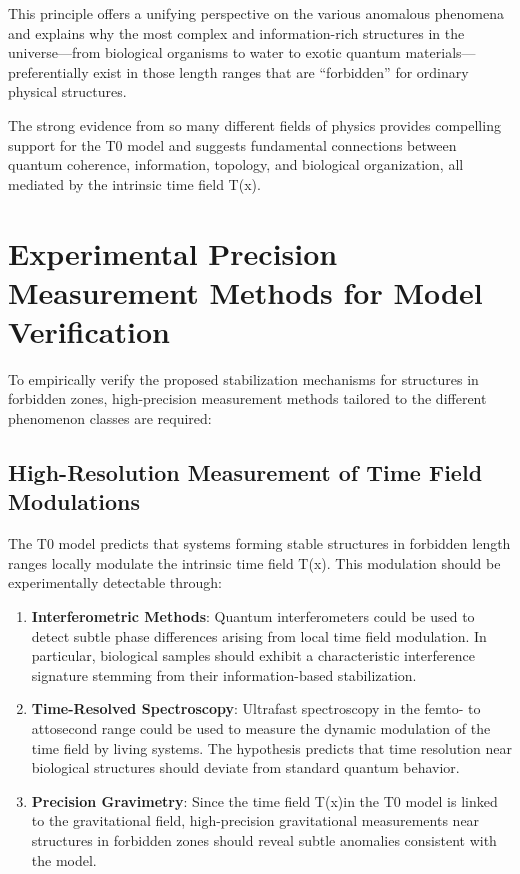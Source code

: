 \documentclass[12pt,a4paper]{article}
\newcommand{\Tfield}{T(x)}
\begin{document}
	This principle offers a unifying perspective on the various anomalous phenomena and explains why the most complex and information-rich structures in the universe—from biological organisms to water to exotic quantum materials—preferentially exist in those length ranges that are ``forbidden'' for ordinary physical structures.
	
	The strong evidence from so many different fields of physics provides compelling support for the T0 model and suggests fundamental connections between quantum coherence, information, topology, and biological organization, all mediated by the intrinsic time field \Tfield.
	
	\section{Experimental Precision Measurement Methods for Model Verification}
	
	To empirically verify the proposed stabilization mechanisms for structures in forbidden zones, high-precision measurement methods tailored to the different phenomenon classes are required:
	
	\subsection{High-Resolution Measurement of Time Field Modulations}
	
	The T0 model predicts that systems forming stable structures in forbidden length ranges locally modulate the intrinsic time field \Tfield. This modulation should be experimentally detectable through:
	
	\begin{enumerate}
		\item \textbf{Interferometric Methods}: Quantum interferometers could be used to detect subtle phase differences arising from local time field modulation. In particular, biological samples should exhibit a characteristic interference signature stemming from their information-based stabilization.
		
		\item \textbf{Time-Resolved Spectroscopy}: Ultrafast spectroscopy in the femto- to attosecond range could be used to measure the dynamic modulation of the time field by living systems. The hypothesis predicts that time resolution near biological structures should deviate from standard quantum behavior.
		
		\item \textbf{Precision Gravimetry}: Since the time field \Tfield in the T0 model is linked to the gravitational field, high-precision gravitational measurements near structures in forbidden zones should reveal subtle anomalies consistent with the model.
	\end{enumerate}
	
\end{document}
